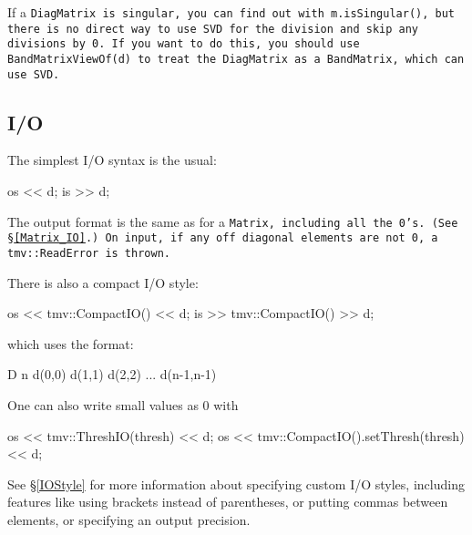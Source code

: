 If a \tt{DiagMatrix} is singular, you can find out with \tt{m.isSingular()},
but there is no direct way to use SVD for the division and skip any
divisions by 0.  If you want to do this, you should use \tt{BandMatrixViewOf(d)} to 
treat the \tt{DiagMatrix} as a \tt{BandMatrix}, which can use SVD.

\subsection{I/O}
\label{DiagMatrix_IO}

The simplest I/O syntax is the usual:
\begin{tmvcode}
os << d;
is >> d;
\end{tmvcode}
The output format is the same as for a \tt{Matrix}, including all the 0's.
(See \S\ref{Matrix_IO}.)  On input, if any off diagonal elements are not 0, a
\tt{tmv::ReadError} is thrown.

There is also a compact I/O style:
\begin{tmvcode}
os << tmv::CompactIO() << d;
is >> tmv::CompactIO() >> d;
\end{tmvcode}
which uses the format:
\begin{tmvcode}
D n d(0,0) d(1,1) d(2,2) ... d(n-1,n-1)
\end{tmvcode}

One can also write small values as 0 with
\begin{tmvcode}
os << tmv::ThreshIO(thresh) << d;
os << tmv::CompactIO().setThresh(thresh) << d;
\end{tmvcode}

See \S\ref{IOStyle} for more information about specifying custom I/O styles, including
features like using brackets instead of parentheses, or putting commas between elements,
or specifying an output precision.  
